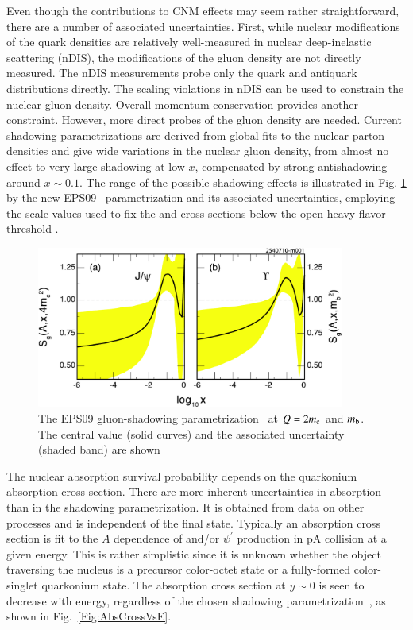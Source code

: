 Even though the contributions to CNM effects may 
seem rather straightforward, there are a number of associated uncertainties. 
First, while nuclear modifications of the quark densities are relatively 
well-measured in nuclear deep-inelastic scattering (nDIS), the modifications of the 
gluon density are not directly measured. The nDIS measurements probe only the 
quark and antiquark distributions directly. The scaling violations in nDIS can 
be used to constrain the nuclear gluon density. Overall momentum conservation 
provides another constraint. However, more direct probes of the gluon 
density are needed. Current shadowing parametrizations are derived from 
global fits to the nuclear parton densities and
give wide variations in the nuclear gluon 
density, from almost no effect to very large shadowing at low-$x$, 
compensated 
by strong antishadowing around $x \sim 0.1$.  The range of the possible
shadowing effects is illustrated  in Fig. \ref{Fig:EPS09Shadowing} 
by the new EPS09~\cite{Eskola:2009uj} parametrization and 
its associated uncertainties, employing the scale values used to fix the 
\jpsi and \ups cross sections below the open-heavy-flavor threshold
\cite{Frawley:2008kk}. 

\begin{figure}
  \begin{center}
    \includegraphics[width=0.9\textwidth]{Figures/EPS09GluonShadowing.pdf}
    \caption{The EPS09 gluon-shadowing parametrization~\cite{Eskola:2009uj} at $Q = 2m_{\rm c}$ 
      and $m_{\rm b}$. The central value (solid curves) and the associated uncertainty
      (shaded band) are shown }
    \label{Fig:EPS09Shadowing}
  \end{center}
\end{figure}


The nuclear absorption survival probability depends on the quarkonium 
absorption cross section. There are more inherent uncertainties 
in absorption than in the shadowing parametrization. It is obtained 
from data on other processes and is independent of the final 
state. Typically an absorption cross section is fit to the $A$ dependence 
of \jpsi and/or $\psi^{'}$ production in pA collision at a given energy. 
This is rather simplistic since it is unknown whether the object traversing the nucleus is a precursor 
color-octet state or a fully-formed color-singlet quarkonium state. The \jpsi absorption cross 
section at $y \sim 0$ is seen to decrease with energy, regardless of the chosen shadowing 
parametrization~\cite{Lourenco:2008sk}, as shown in Fig.~\ref{Fig:AbsCrossVsE}.

